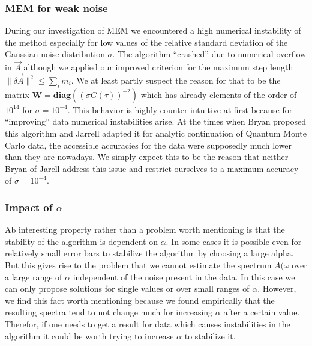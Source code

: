 \subsubsection*{MEM for weak noise}
During our investigation of MEM we encountered a high numerical instability of the method especially for low values of the relative standard deviation of the Gaussian noise distribution $\sigma$.
The algorithm  ``crashed'' due to numerical overflow in $\vec A$ although we applied our improved criterion for the maximum step length $\parallel \vec{\delta A} \parallel^2 \leq \sum_i m_i$.
We at least partly suspect the reason for that to be the matrix $\mathbf{W} = \mathbf{diag}((\sigma G(\tau))^{-2})$ which has already elements of the order of $10^{14}$ for $\sigma = 10^{-4}$.
This behavior is highly counter intuitive at first because for ``improving'' data numerical instabilities arise.
At the times when Bryan proposed this algorithm and Jarrell adapted it for analytic continuation of Quantum Monte Carlo data, the accessible accuracies for the data were supposedly much lower than they are nowadays. We simply expect this to be the reason that neither Bryan of Jarell address this issue and restrict ourselves to a maximum accuracy of $\sigma = 10^{-4}$.
\subsubsection*{Impact of $\alpha$}
Ab interesting property rather than a problem worth mentioning is that the stability of the algorithm is dependent on $\alpha$.
In some cases it is possible even for relatively small error bars to stabilize the algorithm by choosing a large alpha.
But this gives rise to the problem that we cannot estimate the spectrum $A(\omega$ over a large range of $\alpha$ independent of the noise present in the data.
In this case we can only propose solutions for single values or over small ranges of $\alpha$.
However, we find this fact worth mentioning because we found empirically that the resulting spectra tend to not change much for increasing $\alpha$ after a certain value. Therefor, if one needs to get a result for data which causes instabilities in the algorithm it could be worth trying to increase $\alpha$ to stabilize it.
